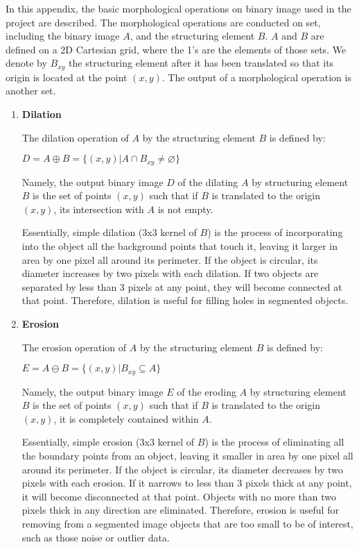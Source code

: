 \label{apdx:mm}

In this appendix, the basic morphological operations on binary image 
used in the project are described.
The morphological operations are conducted on set, including 
the binary image $A$, and the structuring element $B$.
$A$ and $B$ are defined on a 2D Cartesian grid, where the 1's are the
elements of those sets. 
We denote by $B_{xy}$ the structuring element after it has been translated
so that its origin is located at the point $(x, y)$. 
The output of a morphological operation is another set.

\begin{enumerate}

\item {\bf Dilation}

The dilation operation of $A$ by the structuring element $B$ is defined by:

$ D = A \oplus B = \{(x, y)|A \cap B_{xy} \neq \varnothing\}$

Namely, the output binary image $D$ of the dilating $A$ by structuring 
element $B$ is the set of points $(x, y)$ such that if $B$ is translated
to the origin $(x, y)$, its intersection with $A$ is not empty. 

Essentially, simple dilation (3x3 kernel of $B$) is the process of 
incorporating into the object all the background points that touch it,
leaving it larger in area by one pixel all around its perimeter.
If the object is circular, its diameter increases by two pixels with each dilation.
If two objects are separated by less than 3 pixels at any point, 
they will become connected at that point. 
Therefore, dilation is useful for filling holes in segmented objects.

\item {\bf Erosion}

The erosion operation of $A$ by the structuring element $B$ is defined by:

$ E = A \ominus B = \{(x, y)|B_{xy} \subseteq  A\}$

Namely, the output binary image $E$ of the eroding $A$ by structuring
element $B$ is the set of points $(x, y)$ such that if $B$ is translated
to the origin $(x, y)$, it is completely contained within $A$.

Essentially, simple erosion (3x3 kernel of $B$) is the process of 
eliminating all the boundary points from an object,
leaving it smaller in area by one pixel all around its perimeter.
If the object is circular, its diameter decreases by two pixels with each erosion.
If it narrows to less than 3 pixels thick at any point, 
it will become disconnected at that point. 
Objects with no more than two pixels thick in any direction are eliminated.
Therefore, erosion is useful for removing from a segmented image objects
that are too small to be of interest, such as those noise or outlier data.

\end{enumerate}
